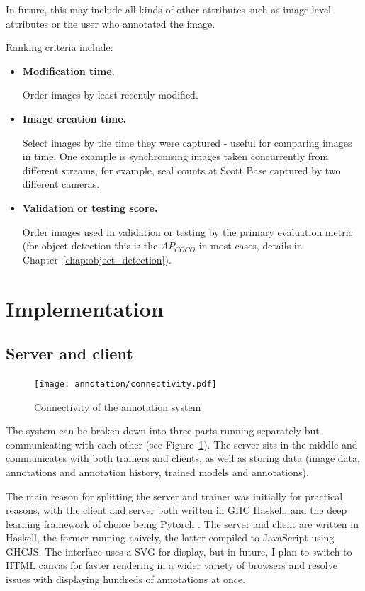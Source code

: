 In future, this may include all kinds of other attributes such as image level attributes or the user who annotated the image.

Ranking criteria include:

\begin{itemize}
    \item {\bf Modification time.} \par
Order images by least recently modified.
    \item {\bf Image creation time. } \par
Select images by the time they were captured - useful for comparing images in time. One example is synchronising images taken concurrently from different streams, for example, seal counts at Scott Base captured by two different cameras.
    \item {\bf Validation or testing score. } \par
Order images used in validation or testing by the primary evaluation metric (for object detection this is the $AP_{COCO}$ in most cases, details in Chapter~\ref{chap:object_detection}).
\end{itemize}

\section {Implementation}

\subsection{Server and client}

\begin{figure}[htb!]
  \centering
  \texttt{[image: annotation/connectivity.pdf]}
  \caption{Connectivity of the annotation system}  
  \label{fig:connectivity}
\end{figure}

The system can be broken down into three parts running separately but communicating with each other (see Figure~\ref{fig:connectivity}). The server sits in the middle and communicates with both trainers and clients, as well as storing data (image data, annotations and annotation history, trained models and annotations).

The main reason for splitting the server and trainer was initially for practical reasons, with the client and server both written in \gls{GHC} Haskell, and the deep learning framework of choice being Pytorch \cite{Paszke2017}. The server and client are written in Haskell, the former running naively, the latter compiled to JavaScript using \gls{GHCJS}. The interface uses a \gls{SVG} for display, but in future, I plan to switch to \gls{HTML} canvas for faster rendering in a wider variety of browsers and resolve issues with displaying hundreds of annotations at once.

